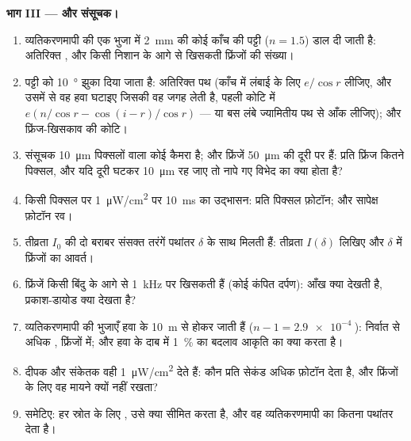 \begin{problem}
\medskip
\noindent\textbf{भाग III ---  और संसूचक।}
\begin{enumerate}[resume]
  \item व्यतिकरणमापी की एक भुजा में \qty{2}{mm} की कोई काँच की पट्टी
        ($n = 1.5$) डाल दी जाती है: अतिरिक्त , और किसी निशान के
        आगे से खिसकती फ्रिंजों की संख्या।
  \item पट्टी को \qty{10}{\degree} झुका दिया जाता है: अतिरिक्त पथ (काँच में
        लंबाई के लिए $e/\cos r$ लीजिए, और उसमें से वह हवा घटाइए जिसकी वह
        जगह लेती है, पहली कोटि में $e(n/\cos r - \cos(i - r)/\cos r)$ --- या
        बस लंबे ज्यामितीय पथ से आँक लीजिए); और फ्रिंज-खिसकाव की
        कोटि।
  \item संसूचक \qty{10}{\micro m} पिक्सलों वाला कोई कैमरा है; और फ्रिंजें
        \qty{50}{\micro m} की दूरी पर हैं: प्रति फ्रिंज कितने पिक्सल, और यदि
        दूरी घटकर \qty{10}{\micro m} रह जाए तो नापे गए विभेद का
        क्या होता है?
  \item किसी पिक्सल पर \qty{1}{\micro W/cm^2} पर \qty{10}{ms} का उद्भासन: प्रति
        पिक्सल फ़ोटॉन; और सापेक्ष फ़ोटॉन रव।
  \item तीव्रता $I_0$ की दो बराबर संसक्त तरंगें पथांतर
        $\delta$ के साथ मिलती हैं: तीव्रता $I(\delta)$ लिखिए और $\delta$ में फ्रिंजों
        का आवर्त।
  \item फ्रिंजें किसी बिंदु के आगे से \qty{1}{kHz} पर खिसकती हैं (कोई कंपित
        दर्पण): आँख क्या देखती है, प्रकाश-डायोड क्या देखता है?
  \item व्यतिकरणमापी की भुजाएँ हवा के \qty{10}{m} से होकर जाती हैं ($n - 1 =
        \qty{2.9e-4}{}$): निर्वात से अधिक , फ्रिंजों में;
        और हवा के दाब में \qty{1}{\%} का बदलाव आकृति का क्या करता है।
  \item दीपक और संकेतक वही \qty{1}{\micro W/cm^2} देते हैं: कौन प्रति सेकंड
        अधिक फ़ोटॉन देता है, और फ्रिंजों के लिए वह मायने क्यों नहीं
        रखता?
  \item समेटिए: हर स्रोत के लिए , उसे क्या सीमित करता है,
        और वह व्यतिकरणमापी का कितना पथांतर देता है।
\end{enumerate}
\end{problem}
